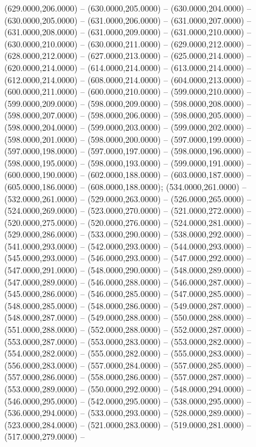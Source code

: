 \begin{scope}[draw=black,fill=cfdae61,line join=round,line width=0.208pt]
    (629.0000,206.0000) -- (630.0000,205.0000) -- (630.0000,204.0000) --
    (630.0000,205.0000) -- (631.0000,206.0000) -- (631.0000,207.0000) --
    (631.0000,208.0000) -- (631.0000,209.0000) -- (631.0000,210.0000) --
    (630.0000,210.0000) -- (630.0000,211.0000) -- (629.0000,212.0000) --
    (628.0000,212.0000) -- (627.0000,213.0000) -- (625.0000,214.0000) --
    (620.0000,214.0000) -- (614.0000,214.0000) -- (613.0000,214.0000) --
    (612.0000,214.0000) -- (608.0000,214.0000) -- (604.0000,213.0000) --
    (600.0000,211.0000) -- (600.0000,210.0000) -- (599.0000,210.0000) --
    (599.0000,209.0000) -- (598.0000,209.0000) -- (598.0000,208.0000) --
    (598.0000,207.0000) -- (598.0000,206.0000) -- (598.0000,205.0000) --
    (598.0000,204.0000) -- (599.0000,203.0000) -- (599.0000,202.0000) --
    (598.0000,201.0000) -- (598.0000,200.0000) -- (597.0000,199.0000) --
    (597.0000,198.0000) -- (597.0000,197.0000) -- (598.0000,196.0000) --
    (598.0000,195.0000) -- (598.0000,193.0000) -- (599.0000,191.0000) --
    (600.0000,190.0000) -- (602.0000,188.0000) -- (603.0000,187.0000) --
    (605.0000,186.0000) -- (608.0000,188.0000);
   (534.0000,261.0000) -- (532.0000,261.0000) --
    (529.0000,263.0000) -- (526.0000,265.0000) -- (524.0000,269.0000) --
    (523.0000,270.0000) -- (521.0000,272.0000) -- (520.0000,275.0000) --
    (520.0000,276.0000) -- (524.0000,281.0000) -- (529.0000,286.0000) --
    (533.0000,290.0000) -- (538.0000,292.0000) -- (541.0000,293.0000) --
    (542.0000,293.0000) -- (544.0000,293.0000) -- (545.0000,293.0000) --
    (546.0000,293.0000) -- (547.0000,292.0000) -- (547.0000,291.0000) --
    (548.0000,290.0000) -- (548.0000,289.0000) -- (547.0000,289.0000) --
    (546.0000,288.0000) -- (546.0000,287.0000) -- (545.0000,286.0000) --
    (546.0000,285.0000) -- (547.0000,285.0000) -- (548.0000,285.0000) --
    (548.0000,286.0000) -- (549.0000,287.0000) -- (548.0000,287.0000) --
    (549.0000,288.0000) -- (550.0000,288.0000) -- (551.0000,288.0000) --
    (552.0000,288.0000) -- (552.0000,287.0000) -- (553.0000,287.0000) --
    (553.0000,283.0000) -- (553.0000,282.0000) -- (554.0000,282.0000) --
    (555.0000,282.0000) -- (555.0000,283.0000) -- (556.0000,283.0000) --
    (557.0000,284.0000) -- (557.0000,285.0000) -- (557.0000,286.0000) --
    (558.0000,286.0000) -- (557.0000,287.0000) -- (553.0000,289.0000) --
    (550.0000,292.0000) -- (548.0000,294.0000) -- (546.0000,295.0000) --
    (542.0000,295.0000) -- (538.0000,295.0000) -- (536.0000,294.0000) --
    (533.0000,293.0000) -- (528.0000,289.0000) -- (523.0000,284.0000) --
    (521.0000,283.0000) -- (519.0000,281.0000) -- (517.0000,279.0000) --

\end{scope}
